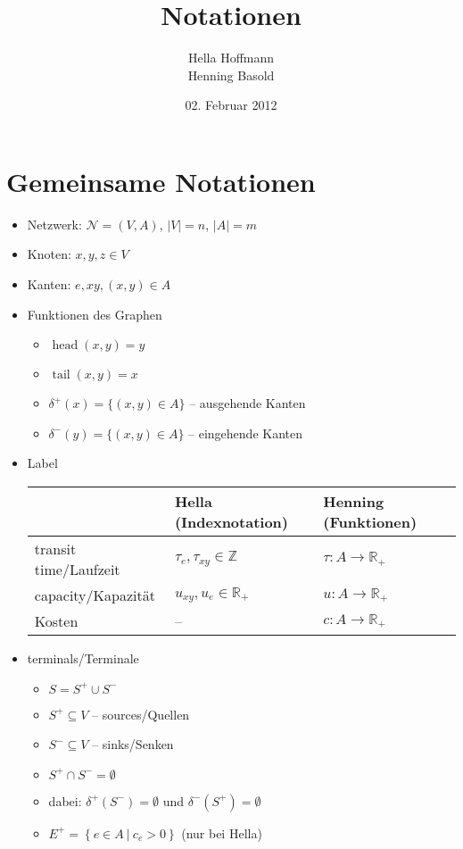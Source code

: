 \documentclass[12pt, a4paper]{article}
\title{Notationen}
\author{Hella Hoffmann \\ Henning Basold}
\date{02. Februar 2012}
\newcommand{\Z}{\mathbb{Z}}
\newcommand{\R}{\mathbb{R}}
\newcommand{\func}[3]{\ensuremath{{#1} \colon {#2} \to {#3}}}
\newcommand{\graph}{\mathcal{N}}
\newcommand{\outEdges}{\delta^+}
\newcommand{\inEdges}{\delta^-}
\DeclareMathOperator{\head}{head}
\DeclareMathOperator{\tail}{tail}
\newcommand{\setDef}[2]{\left\{{#1} \:|\: {#2}\right\}}
\begin{document}
\maketitle

\section*{Gemeinsame Notationen}

\begin{itemize}
    \item Netzwerk: $\graph = (V, A)$, $|V| = n$, $|A| = m$
    \item Knoten: $x, y, z \in V$
    \item Kanten: $e, xy, (x,y) \in A$
    \item Funktionen des Graphen
        \begin{itemize}
            \item $\head(x,y) = y$
            \item $\tail(x,y) = x$
            \item $\outEdges(x) = \{(x,y) \in A\}$ -- ausgehende Kanten
            \item $\inEdges(y) = \{(x,y) \in A\}$ -- eingehende Kanten
        \end{itemize}
    \item Label \\
    	\begin{tabular}{l|l|l}
    	    & Hella (Indexnotation) & Henning (Funktionen) \\ \hline
            transit time/Laufzeit & $\tau_e, \tau_{xy} \in \Z$ & $\func{\tau}{A}{\R_+}$ \\
            capacity/Kapazität & $u_{xy}, u_e \in \R_+$ & $\func{u}{A}{\R_+}$ \\
            Kosten & -- & $\func{c}{A}{\R_+}$ \\
    	\end{tabular}
	\item terminals/Terminale
	    \begin{itemize}
	        \item $S = S^+ \cup S^-$
	        \item $S^+ \subseteq V$ -- sources/Quellen
	        \item $S^- \subseteq V$ -- sinks/Senken
	        \item $S^+ \cap S^- = \emptyset$
	        \item dabei: $\outEdges(S^-) = \emptyset$ und $\inEdges(S^+) = \emptyset$
	        \item $E^+ = \setDef{e \in A}{c_e > 0}$ (nur bei Hella)

\end{itemize}
\end{itemize}
\end{document}
